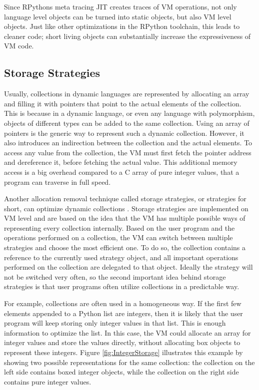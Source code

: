 Since RPythons meta tracing JIT creates traces of VM operations, not only language level objects can be turned into static objects, but also VM level objects.
Just like other optimizations in the RPython toolchain, this leads to cleaner code; short living objects can substantially increase the expressiveness of VM code.


\subsection{Storage Strategies}
\label{cha:storageStrategies}

Usually, collections in dynamic languages are represented by allocating an array and filling it with pointers that point to the actual elements of the collection.
This is because in a dynamic language, or even any language with polymorphism, objects of different types can be added to the same collection.
Using an array of pointers is the generic way to represent such a dynamic collection.
However, it also introduces an indirection between the collection and the actual elements.
To access any value from the collection, the VM must first fetch the pointer address and dereference it, before fetching the actual value.
This additional memory access is a big overhead compared to a C array of pure integer values, that a program can traverse in full speed.

Another allocation removal technique called storage strategies, or strategies for short, can optimize dynamic collections \cite{strategies}.
Storage strategies are implemented on VM level and are based on the idea that the VM has multiple possible ways of representing every collection internally.
Based on the user program and the operations performed on a collection, the VM can switch between multiple strategies and choose the most efficient one.
To do so, the collection contains a reference to the currently used strategy object, and all important operations performed on the collection are delegated to that object.
Ideally the strategy will not be switched very often, so the second important idea behind storage strategies is that user programs often utilize collections in a predictable way.

For example, collections are often used in a homogeneous way.
If the first few elements appended to a Python list are integers, then it is likely that the user program will keep storing only integer values in that list.
This is enough information to optimize the list.
In this case, the VM could allocate an array for integer values and store the values directly, without allocating box objects to represent these integers.
Figure \ref{fig:IntegerStorage} illustrates this example by showing two possible representations for the same collection: the collection on the left side contains boxed integer objects, while the collection on the right side contains pure integer values.


